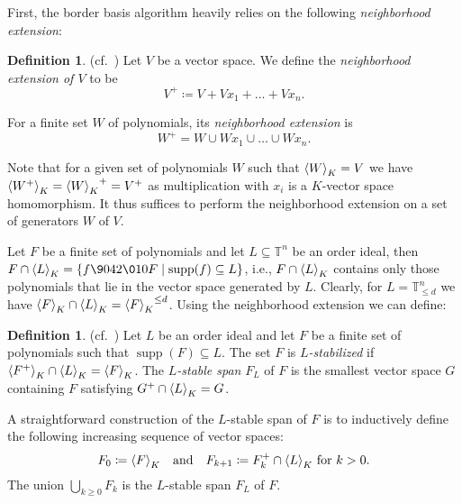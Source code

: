 \documentclass[11pt,oneside,english]{amsart}
\makeatletter
\numberwithin{equation}{section}
\numberwithin{figure}{section}
\theoremstyle{plain}
\theoremstyle{definition}
\newtheorem{defn}[thm]{Definition}
\theoremstyle{definition}
\theoremstyle{remark}
\theoremstyle{plain}
\theoremstyle{plain}
\theoremstyle{plain}
\theoremstyle{problem@}
\makeatother
\begin{document}
First, the border basis algorithm heavily relies
on the following \emph{neighborhood extension}:
\begin{defn}
\label{def:lstabSpan}
(cf.\ \cite[Definition 7.1 and paragraph preceding Proposition 13]{kehrein2006cbb})
Let $V$ be a vector space. We define the \emph{neighborhood
extension of $V$} to be
\[V^{+}\coloneqq V+Vx_{1}+\dots+Vx_{n}.\]

For a finite set \(W\) of polynomials,
its \emph{neighborhood extension} is
\[ W^{+}=W\cup Wx_{1}\cup\dots\cup Wx_{n}. \]
\end{defn}
Note that for a given set of polynomials $W$ such that ${{\left\langle {W}\right\rangle}\sb{K}}=V$
we have ${{\left\langle {W^{+}}\right\rangle}\sb{K}}={{\left\langle {W}\right\rangle}\sb{K}}^{+}=V^{+}$
as multiplication with $x_{i}$ is a $K$-vector space homomorphism.
It thus suffices to perform the neighborhood extension on a set of
generators $W$ of $V$. 

Let $F$ be a finite set of polynomials and let $L\subseteq{\mathbb{T}}^{n}$
be an order ideal, then $F\cap {{\left\langle {L}\right\rangle}\sb{K}} = \{f{\9042\010} F\mid\operatorname{supp}(f)\subseteq L\}$,
i.e., $F\cap {{\left\langle {L}\right\rangle}\sb{K}}$ contains only those polynomials that lie in the vector
space generated by $L$. Clearly, for $L = {\mathbb{T}}^n_{\leq d}$ we have ${{\left\langle {F}\right\rangle}\sb{K}} \cap {{\left\langle {L}\right\rangle}\sb{K}} = {{\left\langle {F}\right\rangle}\sb{K}}^{\leq d}$. Using the neighborhood extension we can define:
\begin{defn}(cf.\ \cite[Definition 10]{kehrein2006cbb})
Let $L$ be an order ideal and let $F$ be a finite
set of polynomials such that $\operatorname{supp}(F)\subseteq L$.
The set \(F\) is \emph{$L$-stabilized} if
${{\left\langle {F^{+}}\right\rangle}\sb{K}} \cap {{\left\langle {L}\right\rangle}\sb{K}} = {{\left\langle {F}\right\rangle}\sb{K}}$.
The \emph{$L$-stable span} \(F_L\) of \(F\) is
the smallest vector space \(G\) containing \(F\) satisfying \(G^+ \cap {{\left\langle {L}\right\rangle}\sb{K}} = G\).
\end{defn}
A straightforward construction of the \(L\)-stable span of \(F\) is
to inductively define the following increasing sequence of vector spaces:
\[
F_{0} \coloneqq {{\left\langle {F}\right\rangle}\sb{K}} \quad\text{and}\quad
F_{k+1} \coloneqq F_{k}^{+} \cap {{\left\langle {L}\right\rangle}\sb{K}}\text{ for \(k>0\)}.
\]
The union $\bigcup_{k\geq0} F_{k}$ is the $L$-stable span \(F_{L}\) of \(F\).
\end{document}
